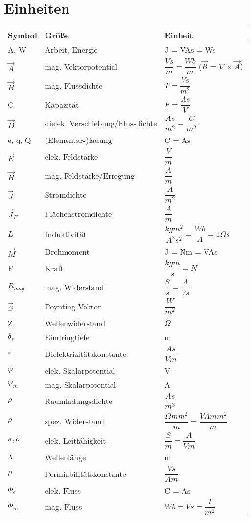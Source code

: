 \section{Einheiten} \label{sec:Einheiten}
\begin{tabular}{l|l|l}
    \hline
    Symbol & Größe & Einheit\\
    \hline 
    A, W & Arbeit, Energie & J = VAs = Ws\\
    $\vec{A}$ & mag. Vektorpotential & $\dfrac{Vs}{m} = \dfrac{Wb}{m}$ ($\vec{B}$ = $\nabla \times \vec{A}$)\\
    $\vec{B}$ & mag. Flussdichte & $T = \dfrac{Vs}{m^2}$\\
    C & Kapazität & $F = \dfrac{As}{V}$\\
    $\vec{D}$ & dielek. Verschiebung/Flussdichte & $\dfrac{As}{m^2} = \dfrac{C}{m^2}$\\
    e, q, Q & (Elementar-)ladung & C = As\\
    $\vec{E}$ & elek. Feldstärke & $\dfrac{V}{m}$ \\
    $\vec{H}$ & mag. Feldstärke/Erregung & $\dfrac{A}{m}$\\
    $\vec{J}$ & Stromdichte & $\dfrac{A}{m^2}$\\
    $\vec{J}_F$ & Flächenstromdichte & $\dfrac{A}{m}$\\
    $L$ & Induktivität & $\dfrac{kgm^2}{A^2s^2} = \dfrac{Wb}{A} = 1 \Omega s$ \\
    $\vec{M}$ & Drehmoment & J = Nm = VAs\\
    F & Kraft & $\dfrac{kgm}{s} = N$\\
    $R_{mag}$ & mag. Widerstand & $\dfrac{S}{s} = \dfrac{A}{Vs}$\\
    $\vec{S}$ & Poynting-Vektor & $\dfrac{W}{m^2}$\\
    Z & Wellenwiderstand & $\Omega$\\
    $\delta_s$ & Eindringtiefe & m \\
    $\varepsilon$ & Dielektrizitätskonstante & $\dfrac{As}{Vm}$\\
    $\varphi$ & elek. Skalarpotential & V \\
    $\varphi_m$ & mag. Skalarpotential & A \\
    $\rho$ & Raumladungsdichte & $\dfrac{As}{m^3}$\\
    $\rho$ & spez. Widerstand & $\dfrac{\Omega mm^2}{m} = \dfrac{VA mm^2}{m}$\\
    $\kappa, \sigma$ & elek. Leitfähigkeit & $\dfrac{S}{m} = \dfrac{A}{Vm}$\\
    $\lambda$ & Wellenlänge & m\\
    $\mu$ & Permiabilitätskonstante & $\dfrac{Vs}{Am}$\\
    $\Phi_e$ & elek. Fluss & C = As\\
    $\Phi_m$ & mag. Fluss & $Wb = Vs = \dfrac{T}{m^2}$\\

    \hline
\end{tabular} 
